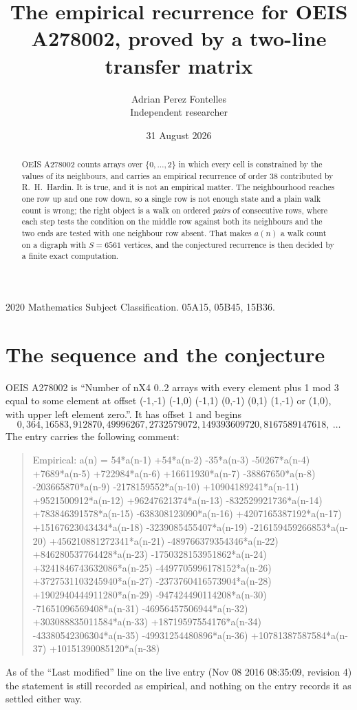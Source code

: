 \documentclass[11pt,a4paper]{article}
\title{The empirical recurrence for OEIS A278002, proved by a two-line transfer matrix}
\author{Adrian Perez Fontelles\\ \small Independent researcher}
\date{31 August 2026}
\theoremstyle{plain}
\theoremstyle{definition}
\begin{document}
\maketitle

\begin{abstract}
OEIS A278002 counts arrays over $\{0,\dots,2\}$ in which every cell is constrained by the
values of its neighbours, and carries an empirical recurrence of order $38$ contributed
by R.~H.~Hardin. It is true, and it is not an empirical matter. The neighbourhood reaches one
row up and one row down, so a single row is not enough state and a plain walk count
is wrong; the right object is a walk on ordered \emph{pairs} of consecutive rows, where
each step tests the condition on the middle row against both its neighbours and the two
ends are tested with one neighbour row absent. That makes $a(n)$ a walk count on a digraph
with $S=6561$ vertices, and the conjectured recurrence is then decided by a finite exact
computation.
\end{abstract}

\noindent\small 2020 Mathematics Subject Classification. 05A15, 05B45, 15B36.\normalsize

\section{The sequence and the conjecture}

OEIS A278002 is ``Number of nX4 0..2 arrays with every element plus 1 mod 3 equal to some element at offset (-1,-1) (-1,0) (-1,1) (0,-1) (0,1) (1,-1) or (1,0), with upper left element zero.''. It has offset $1$ and begins
\[
0, 364, 16583, 912870, 49996267, 2732579072, 149393609720, 8167589147618,\ \dots
\]
The entry carries the following comment:
\begin{quote}\small
Empirical: a(n) = 54*a(n-1) +54*a(n-2) -35*a(n-3) -50267*a(n-4) +7689*a(n-5) +722984*a(n-6) +16611930*a(n-7) -38867650*a(n-8) -203665870*a(n-9) -2178159552*a(n-10) +10904189241*a(n-11) +9521500912*a(n-12) +96247621374*a(n-13) -832529921736*a(n-14) +783846391578*a(n-15) -638308123090*a(n-16) +4207165387192*a(n-17) +15167623043434*a(n-18) -3239085455407*a(n-19) -216159459266853*a(n-20) +456210881272341*a(n-21) -489766379354346*a(n-22) +846280537764428*a(n-23) -1750328153951862*a(n-24) +3241846743632086*a(n-25) -4497705996178152*a(n-26) +3727531103245940*a(n-27) -2373760416573904*a(n-28) +1902940444911280*a(n-29) -947424490114208*a(n-30) -71651096569408*a(n-31) -46956457506944*a(n-32) +303088835011584*a(n-33) +18719597554176*a(n-34) -43380542306304*a(n-35) -49931254480896*a(n-36) +10781387587584*a(n-37) +10151390085120*a(n-38)
\end{quote}
As of the ``Last modified'' line on the live entry (Nov 08 2016 08:35:09, revision 4) the statement is
still recorded as empirical, and nothing on the entry records it as settled either way.
\end{document}
